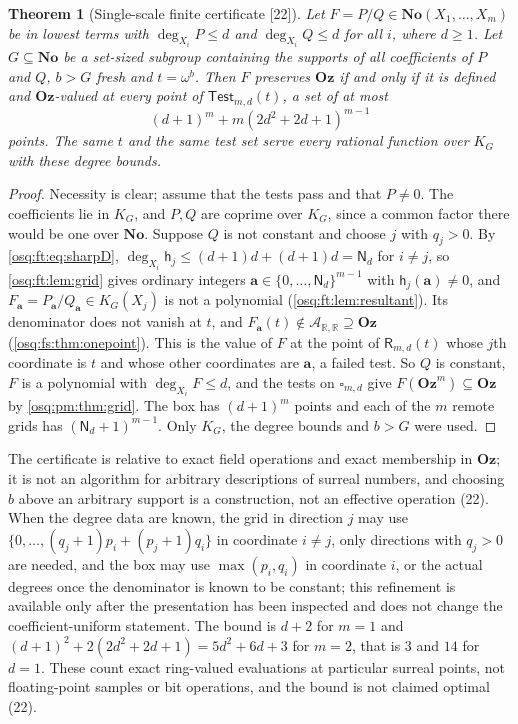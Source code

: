 \documentclass[11pt,letterpaper]{article}
\numberwithin{equation}{section}
\newtheorem{theorem}{Theorem}[section]
\theoremstyle{definition}
\theoremstyle{remark}
\theoremstyle{plain}
\newcommand{\No}{\mathbf{No}}
\newcommand{\Oz}{\mathbf{Oz}}
\newcommand{\R}{\mathbb R}
\newcommand{\A}{\mathcal A}          %
\newcommand{\src}[1]{\textup{\textsf{[#1]}}}
\begin{document}
\begin{theorem}[Single-scale finite certificate \src{22}]\label{osq:ft:thm:certificate}
Let $F=P/Q\in\No(X_1,\dots,X_m)$ be in lowest terms with $\deg_{X_i}P\le d$ and $\deg_{X_i}Q\le d$ for all $i$, where $d\ge1$. Let $G\subseteq\No$ be a
set-sized subgroup containing the supports of all coefficients of $P$ and $Q$, $b>G$ fresh and $t=\omega^b$. Then $F$ preserves $\Oz$ if and only if it
is defined and $\Oz$-valued at every point of $\mathsf{Test}_{m,d}(t)$, a set of at most
\[
 (d+1)^m+m(2d^2+2d+1)^{m-1}
\]
points. The same $t$ and the same test set serve every rational function over $K_G$ with these degree bounds.
\end{theorem}
\begin{proof}
Necessity is clear; assume that the tests pass and that $P\ne0$. The coefficients lie in $K_G$, and $P,Q$ are coprime over $K_G$, since a common factor
there would be one over $\No$. Suppose $Q$ is not constant and choose $j$ with $q_j>0$. By \eqref{osq:ft:eq:sharpD},
$\deg_{X_i}\mathsf h_j\le(d+1)d+(d+1)d=\mathsf N_d$ for $i\ne j$, so \cref{osq:ft:lem:grid} gives ordinary integers
$\mathbf a\in\{0,\dots,\mathsf N_d\}^{m-1}$ with $\mathsf h_j(\mathbf a)\ne0$, and $F_{\mathbf a}=P_{\mathbf a}/Q_{\mathbf a}\in K_G(X_j)$ is not a
polynomial (\cref{osq:ft:lem:resultant}). Its denominator does not vanish at $t$, and $F_{\mathbf a}(t)\notin\A_{\R,\R}\supseteq\Oz$
(\cref{osq:fs:thm:onepoint}). This is the value of $F$ at the point of $\mathsf R_{m,d}(t)$ whose $j$th coordinate is $t$ and whose other coordinates
are $\mathbf a$, a failed test. So $Q$ is constant, $F$ is a polynomial with $\deg_{X_i}F\le d$, and the tests on $\square_{m,d}$ give
$F(\Oz^m)\subseteq\Oz$ by \cref{osq:pm:thm:grid}. The box has $(d+1)^m$ points and each of the $m$ remote grids has $(\mathsf N_d+1)^{m-1}$. Only $K_G$,
the degree bounds and $b>G$ were used.
\end{proof}

The certificate is relative to exact field operations and exact membership in $\Oz$; it is not an algorithm for arbitrary descriptions of surreal
numbers, and choosing $b$ above an arbitrary support is a construction, not an effective operation (22). When the degree data are known, the grid in
direction $j$ may use $\{0,\dots,(q_j+1)p_i+(p_j+1)q_i\}$ in coordinate $i\ne j$, only directions with $q_j>0$ are needed, and the box may use
$\max(p_i,q_i)$ in coordinate $i$, or the actual degrees once the denominator is known to be constant; this refinement is available only after the
presentation has been inspected and does not change the coefficient-uniform statement. The bound is $d+2$ for $m=1$ and
$(d+1)^2+2(2d^2+2d+1)=5d^2+6d+3$ for $m=2$, that is $3$ and $14$ for $d=1$. These count exact ring-valued evaluations at particular surreal points,
not floating-point samples or bit operations, and the bound is not claimed optimal (22).
\end{document}
